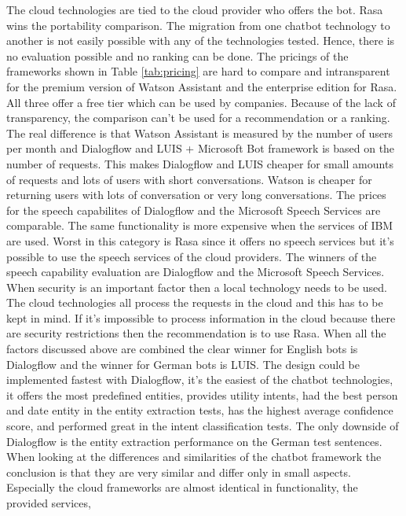 The cloud technologies are tied to the cloud provider who offers the bot.
Rasa wins the portability comparison.
The migration from one chatbot technology to another is not easily possible with 
any of the technologies tested. 
Hence, there is no evaluation possible and no ranking can be done.
The pricings of the frameworks shown in Table \ref{tab:pricing} are hard to compare and intransparent for the premium version of Watson Assistant and the enterprise edition for Rasa.
All three offer a free tier which can be used by companies.
Because of the lack of transparency, the comparison can't be used for a recommendation or a ranking.
The real difference is that Watson Assistant is measured by the number of users per month and 
Dialogflow and LUIS + Microsoft Bot framework is based on the number of requests.
This makes Dialogflow and LUIS cheaper for small amounts of requests and lots of users with short conversations.
Watson is cheaper for returning users with lots of conversation or very long conversations.
The prices for the speech capabilites of Dialogflow and the Microsoft Speech Services are comparable.
The same functionality is more expensive when the services of IBM are used.
Worst in this category is Rasa since it offers no speech services but it's possible to use the 
speech services of the cloud providers.
The winners of the speech capability evaluation are Dialogflow and the Microsoft Speech Services.
When security is an important factor then a local technology needs to be used.
The cloud technologies all process the requests in the cloud and this has to be 
kept in mind.
If it's impossible to process information in the cloud because there are security restrictions
then the recommendation is to use Rasa.
When all the factors discussed above are combined the clear winner for English bots is Dialogflow and the 
winner for German bots is LUIS.
The design could be implemented fastest with Dialogflow, it's the easiest of the chatbot technologies,
it offers the most predefined entities, provides utility intents, had the best person and date
entity in the entity extraction tests, has the highest average confidence score, 
and performed great in the intent classification tests.
The only downside of Dialogflow is the entity extraction performance on the German test sentences.
When looking at the differences and similarities of the chatbot framework the conclusion is that 
they are very similar and differ only in small aspects.
Especially the cloud frameworks are almost identical in functionality, the provided services,
